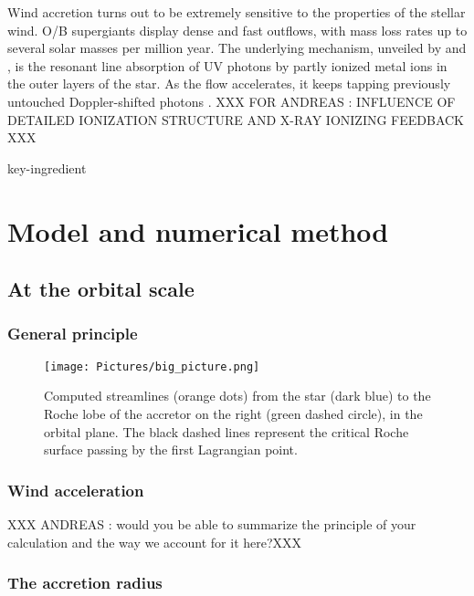 \documentclass[a4paper,fleqn,usenatbib]{article}
\begin{document}
Wind accretion turns out to be extremely sensitive to the properties of the stellar wind. O/B supergiants display dense and fast outflows, with mass loss rates up to several solar masses per million year. The underlying mechanism, unveiled by \cite{Lucy1970} and \cite{Castor1975}, is the resonant line absorption of UV photons by partly ionized metal ions in the outer layers of the star. As the flow accelerates, it keeps tapping previously untouched Doppler-shifted photons \cite{}. XXX FOR ANDREAS : INFLUENCE OF DETAILED IONIZATION STRUCTURE AND X-RAY IONIZING FEEDBACK XXX


 key-ingredient


\section{Model and numerical method}
\label{sec:model}

\subsection{At the orbital scale}
\label{sec:orb_scale}
\subsubsection{General principle}
\label{sec:pple}

\begin{figure}
\centering
\texttt{[image: Pictures/big\_picture.png]}
\caption{Computed streamlines (orange dots) from the star (dark blue) to the Roche lobe of the accretor on the right (green dashed circle), in the orbital plane. The black dashed lines represent the critical Roche surface passing by the first Lagrangian point.}
\label{fig:big_picture}
\end{figure} 


\subsubsection{Wind acceleration}
\label{sec:wind_acc}
XXX ANDREAS : would you be able to summarize the principle of your calculation and the way we account for it here?XXX 

\subsubsection{The accretion radius}
\label{sec:acc_rad}
\end{document}
